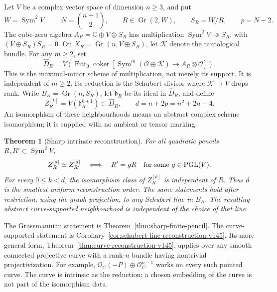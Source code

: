 \documentclass[11pt,reqno]{amsart}
\numberwithin{equation}{section}
\newtheorem{theorem}{Theorem}[section]
\theoremstyle{definition}\newtheorem{definition}[theorem]{Definition}
\theoremstyle{remark}\newtheorem{remark}[theorem]{Remark}
\newcommand{\C}{\mathbb C}\newcommand{\Q}{\mathbb Q}
\newcommand{\OO}{\mathcal O}\newcommand{\II}{\mathcal I}
\DeclareMathOperator{\Sym}{Sym}\DeclareMathOperator{\Gr}{Gr}
\DeclareMathOperator{\Fitt}{Fitt}\DeclareMathOperator{\Ann}{Ann}
\DeclareMathOperator{\coker}{coker}\DeclareMathOperator{\codim}{codim}
\begin{document}
Let \(V\) be a complex vector space of dimension \(n\ge3\), and put
\[
 W=\Sym^2V,\qquad N=\binom{n+1}{2},\qquad
 R\in\Gr(2,W),\qquad S_R=W/R,\qquad p=N-2.
\]
The cube-zero algebra \(A_R=\C\oplus V\oplus S_R\) has multiplication
\(\Sym^2V\twoheadrightarrow S_R\), with
\((V\oplus S_R)S_R=0\).  On \(X_R=\Gr(n,V\oplus S_R)\), let
\(\mathcal K\) denote the tautological bundle.  For any \(m\ge2\), set
\begin{equation}\label{eq:failure-intro}
 \widehat D_R=V\!\left(\Fitt_0\coker[
 \Sym^m(\OO\oplus\mathcal K)\longrightarrow A_R\otimes\OO]\right).
\end{equation}
This is the maximal-minor scheme of multiplication, not merely its
support.  It is independent of \(m\ge2\).  Its reduction is the
Schubert divisor where \(\mathcal K\to V\) drops rank.  Write
\(B_R=\Gr(n,S_R)\), let \(\mathfrak b_R\) be its ideal in
\(\widehat D_R\), and define
\[
 Z_R^{[k]}=V(\mathfrak b_R^{k+1})\subset\widehat D_R,
       \qquad d=n+2p=n^2+2n-4.
\]
An isomorphism of these neighbourhoods means an abstract complex
scheme isomorphism; it is supplied with no ambient or tensor marking.

\begin{theorem}[Sharp intrinsic reconstruction]
\label{thm:principal-finite-v143}
For all quadratic pencils \(R,R'\subset\Sym^2V\),
\[
 Z_R^{[d]}\simeq Z_{R'}^{[d]}
       \quad\Longleftrightarrow\quad
 R'=gR\quad\text{for some }g\in\operatorname{PGL}(V).
\]
For every \(0\le k<d\), the isomorphism class of \(Z_R^{[k]}\)
is independent of \(R\).  Thus \(d\) is the smallest uniform
reconstruction order.  The same statements hold after restriction,
using the graph projection, to any Schubert line in \(B_R\).
The resulting abstract curve-supported neighbourhood is independent
of the choice of that line.
\end{theorem}

The Grassmannian statement is Theorem~\ref{thm:sharp-finite-pencil}.
The curve-supported statement is
Corollary~\ref{cor:schubert-line-reconstruction-v145}.  Its more general
form, Theorem~\ref{thm:curve-reconstruction-v145}, applies over any
smooth connected projective curve with a rank-\(n\) bundle having
nontrivial projectivization.  For example,
\(\OO_C(-P)\oplus\OO_C^{n-1}\) works on every such pointed curve.
The curve is intrinsic as the reduction; a chosen embedding of the
curve is not part of the isomorphism data.
\end{document}
